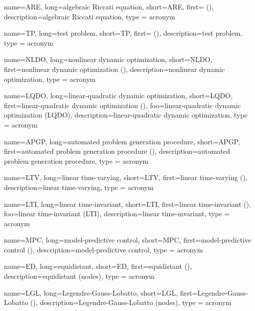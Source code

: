 {
	name={ARE},
	long={algebraic Riccati equation},
	short={ARE},
	first={ ()},
	description={algebraic Riccati equation},
	type = acronym
}

{
	name={TP},
	long={test problem},
	short={TP},
	first={ ()},
	description={test problem},
	type = acronym
}

{
	name={NLDO},
	long={nonlinear dynamic optimization},
	short={NLDO},
	first={nonlinear dynamic optimization ()},
	description={nonlinear dynamic optimization},
	type = acronym
}

{
	name={LQDO},
	long={linear-quadratic dynamic optimization},
	short={LQDO},
	first={linear-quadratic dynamic optimization ()},
	foo={linear-quadratic dynamic optimization (LQDO)},
	description={linear-quadratic dynamic optimization},
	type = acronym
}

{
	name={APGP},
	long={automated problem generation procedure},
	short={APGP},
	first={automated problem generation procedure ()},
	description={automated problem generation procedure},
	type = acronym
}


{
	name={LTV},
	long={linear time-varying},
	short={LTV},
	first={linear time-varying ()},
	description={linear time-varying},
	type = acronym
}

{
	name={LTI},
	long={linear time-invariant},
	short={LTI},
	first={linear time-invariant ()},
	foo={linear time-invariant (LTI)},
	description={linear time-invariant},
	type = acronym
}

{
	name={MPC},
	long={model-predictive control},
	short={MPC},
	first={model-predictive control ()},
	description={model-predictive control},
	type = acronym
}

{
	name={ED},
	long={equidistant},
	short={ED},
	first={equidistant ()},
	description={equidistant (nodes)},
	type = acronym
}

{
	name={LGL},
	long={Legendre-Gauss-Lobatto},
	short={LGL},
	first={Legendre-Gauss-Lobatto ()},
	description={Legendre-Gauss-Lobatto (nodes)},
	type = acronym
}

